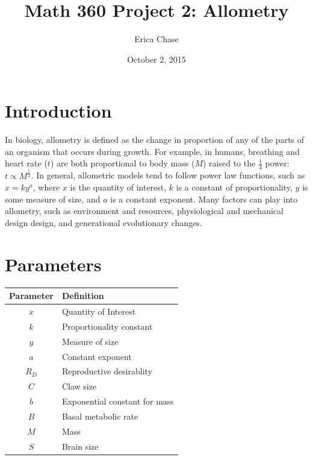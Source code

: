 \documentclass[10pt,letterpaper]{article}
\begin{document}
	\title{Math 360 Project 2: Allometry}
	\author{Erica Chase}
	\date {October 2, 2015}
	\maketitle
	\section{Introduction}
		In biology, allometry is defined as the change in proportion of any of the parts of an organism that occurs during growth. For example, in humans, breathing and heart rate ($t$) are both proportional to body mass ($M$) raised to the $\frac 1 4$ power: $t \propto M^{\frac 1 4}$. In general, allometric models tend to follow power law functions, such as $x = ky^{a}$, where $x$ is the quantity of interest, $k$ is a constant of proportionality, $y$ is some measure of size, and $a$ is a constant exponent. Many factors can play into allometry, such as environment and resources, physiological and mechanical design design, and generational evolutionary changes. 
	\section{Parameters}
		\begin{center}
			\begin{tabular}{c l}
				Parameter & Definition \\
				\hline \hline
				$x$ & Quantity of Interest \\
				$k$ & Proportionality constant \\
				$y$ & Measure of size \\
				$a$ & Constant exponent \\
				\hline
				$R_{D}$ & Reproductive desirablity \\
				$C$ & Claw size \\
				$b$ & Exponential constant for mass \\
				\hline
				$B$ & Basal metabolic rate \\
				$M$ & Mass \\
				\hline
				$S$ & Brain size
			\end{tabular}
		\end{center}
\end{document}

